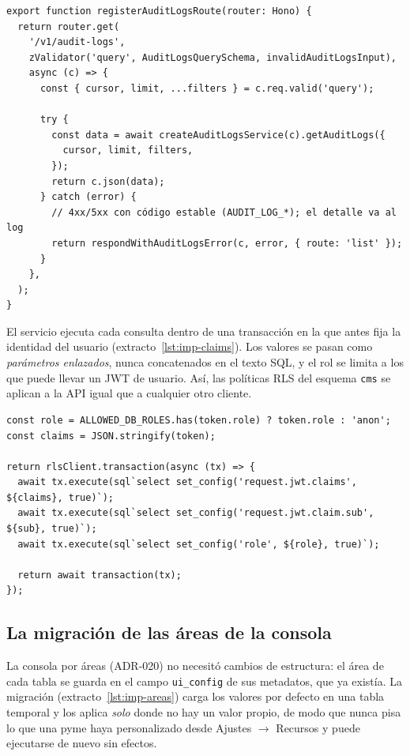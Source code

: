 \begin{lstlisting}[style=pymekit, caption={Ruta del registro de auditoría (\texttt{get-audit-logs-route.ts}, recortado).}, label={lst:imp-hono}]
export function registerAuditLogsRoute(router: Hono) {
  return router.get(
    '/v1/audit-logs',
    zValidator('query', AuditLogsQuerySchema, invalidAuditLogsInput),
    async (c) => {
      const { cursor, limit, ...filters } = c.req.valid('query');

      try {
        const data = await createAuditLogsService(c).getAuditLogs({
          cursor, limit, filters,
        });
        return c.json(data);
      } catch (error) {
        // 4xx/5xx con código estable (AUDIT_LOG_*); el detalle va al log
        return respondWithAuditLogsError(c, error, { route: 'list' });
      }
    },
  );
}
\end{lstlisting}

El servicio ejecuta cada consulta dentro de una transacción en la que antes
fija la identidad del usuario (extracto~\ref{lst:imp-claims}). Los valores se
pasan como \emph{parámetros enlazados}, nunca concatenados en el texto SQL, y
el rol se limita a los que puede llevar un JWT de usuario. Así, las políticas
RLS del esquema \texttt{cms} se aplican a la API igual que a cualquier otro
cliente.

\begin{lstlisting}[style=pymekit, caption={Identidad del usuario en cada transacción del CMS (\texttt{drizzle-client.ts}, recortado).}, label={lst:imp-claims}]
const role = ALLOWED_DB_ROLES.has(token.role) ? token.role : 'anon';
const claims = JSON.stringify(token);

return rlsClient.transaction(async (tx) => {
  await tx.execute(sql`select set_config('request.jwt.claims', ${claims}, true)`);
  await tx.execute(sql`select set_config('request.jwt.claim.sub', ${sub}, true)`);
  await tx.execute(sql`select set_config('role', ${role}, true)`);

  return await transaction(tx);
});
\end{lstlisting}

\subsection{La migración de las áreas de la consola}

La consola por áreas (ADR-020) no necesitó cambios de estructura: el área de
cada tabla se guarda en el campo \texttt{ui\_config} de sus metadatos, que ya
existía. La migración (extracto~\ref{lst:imp-areas}) carga los valores por
defecto en una tabla temporal y los aplica \emph{solo} donde no hay un valor
propio, de modo que nunca pisa lo que una pyme haya personalizado desde
Ajustes $\rightarrow$ Recursos y puede ejecutarse de nuevo sin efectos.

